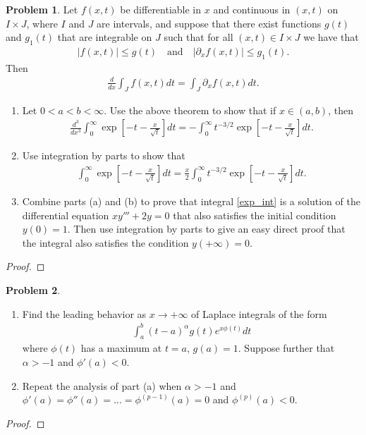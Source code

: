 \documentclass[12pt]{article}
\theoremstyle{definition}
\newtheorem{problem}{Problem}
\begin{document}
\begin{problem}
  Let $f(x, t)$ be differentiable in $x$ and continuous in $(x, t)$ on $I \times J$,
  where $I$ and $J$ are intervals, and suppose that there exist functions $g(t)$ and $g_1(t)$
  that are integrable on $J$ such that for all $(x,t) \in I \times J$ we have that
  \begin{align*}
    |f(x,t)|\leq g(t) \quad \text{and} \quad |\partial_x f(x,t)| \leq g_1(t).
  \end{align*}
  Then
  \begin{align*}
    \frac{d}{dx} \int_J f(x,t) dt = \int_J \partial_x f(x,t) dt.
  \end{align*}
  \begin{enumerate}
    \item Let $0 < a < b < \infty$. Use the above theorem to show that if $x \in (a,b)$, then
      \begin{align*}
        \frac{d^3}{dx^3} \int_0^\infty \exp\left[-t - \frac{x}{\sqrt{t}}\right] dt = -\int_0^\infty t^{-3/2}\exp\left[-t - \frac{x}{\sqrt{t}}\right] dt.
      \end{align*}
    \item Use integration by parts to show that
      \begin{align*}
        \int_0^\infty \exp\left[-t - \frac{x}{\sqrt{t}}\right] dt = \frac{x}{2}\int_0^\infty t^{-3/2}\exp\left[-t - \frac{x}{\sqrt{t}}\right] dt.
      \end{align*}
    \item Combine parts (a) and (b) to prove that integral \eqref{exp_int} is a solution of the
      differential equation $xy''' + 2y = 0$ that also satisfies the initial condition $y(0) = 1$.
      Then use integration by parts to give an easy direct proof that the integral also satisfies
      the condition $y(+\infty) = 0$.
  \end{enumerate}
\end{problem}

\begin{proof}
\end{proof}
\newpage


\begin{problem}
  \begin{enumerate}
    \item Find the leading behavior as $x\to + \infty$ of Laplace integrals of the form
      \begin{align*}
        \int_a^b (t-a) ^\alpha g(t) e^{x\phi(t)} dt
      \end{align*}
      where $\phi(t)$ has a maximum at $t = a$, $g(a) = 1$. Suppose further that $\alpha > -1$ and $\phi'(a) < 0$.
    \item Repeat the analysis of part (a) when $\alpha > -1$
      and $\phi'(a) = \phi''(a) = \dots = \phi^{(p-1)}(a) = 0$ and $\phi^{(p)}(a) < 0$.
  \end{enumerate}
\end{problem}

\begin{proof}
\end{proof}
\newpage
\end{document}
